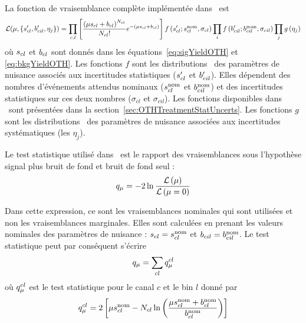 La fonction de vraisemblance compl\`ete impl\'ement\'ee dans \opthylic~est
\begin{equation}
\label{eq:fullLhoodOTH}
\Lh(\mu,\{\scck',\bcik',\eta_j\})=\prod\limits_{c,l}\left[\frac{\left(\mu\scck+\bck\right)^{\nck}}{\nck!}e^{-\left(\mu\scck+\bck\right)}\right]f\left(\scck';\scknom,\sigma_{cl}\right)\prod\limits_{i}f\left(\bcik';\bciknom,\sigma_{cil}\right)\prod\limits_{j}g\left(\eta_j\right)
\end{equation}
o\`u $s_{cl}$ et $b_{cl}$ sont donn\'es dans les \'equations~\ref{eq:sigYieldOTH} et \ref{eq:bkgYieldOTH}. Les fonctions $f$ sont les distributions \prior~des param\`etres de nuisance associ\'es aux incertitudes statistiques ($s_{cl}'$ et $b_{cil}'$). Elles d\'ependent des nombres d'\'ev\'enements attendus nominaux ($s_{cl}^{\text{nom}}$ et $b_{cil}^{\text{nom}}$) et des incertitudes statistiques sur ces deux nombres ($\sigma_{cl}$ et $\sigma_{cil}$). Les fonctions disponibles dans \opthylic~sont pr\'esent\'ees dans la section~\ref{sec:OTHTreatmentStatUncerts}. Les fonctions $g$ sont les distributions \prior~des param\`etres de nuisance associ\'ees aux incertitudes syst\'ematiques (les $\eta_j$). 

Le test statistique utilis\'e dans \opthylic~est le rapport des vraisemblances sous l'hypoth\`ese signal plus bruit de fond et bruit de fond seul :
\begin{equation}
\label{eq:testStatOTHinOTHSec}
q_\mu=-2\ln\frac{{\cal L}\left(\mu\right)}{{\cal L}\left(\mu=0\right)}
\end{equation}

Dans cette expression, ce sont les vraisemblances nominales qui sont utilis\'ees et non les vraisemblances marginales. Elles sont calcul\'ees en prenant 
les valeurs nominales des param\`etres de nuisance : $s_{cl}=s_{cl}^{\text{nom}}$ et $b_{cil}=b_{cil}^{\text{nom}}$. Le test statistique peut par cons\'equent s'\'ecrire
\begin{equation}
\label{eq:testStatOTHAllChannels}
q_\mu=\sum\limits_{cl} q_\mu^{cl}
\end{equation}
o\`u $q_\mu^{cl}$ est le test statistique pour le canal $c$ et le bin $l$ donn\'e par 
\begin{equation}
\label{eq:testStatOTHChannelc}
q_\mu^{cl}=2\left[\mu s_{cl}^{\text{nom}}-N_{cl}\ln\left(\frac{\mu s_{cl}^{\text{nom}}+b_{cl}^{\text{nom}}}{b_{cl}^{\text{nom}}}\right)\right]
\end{equation}

